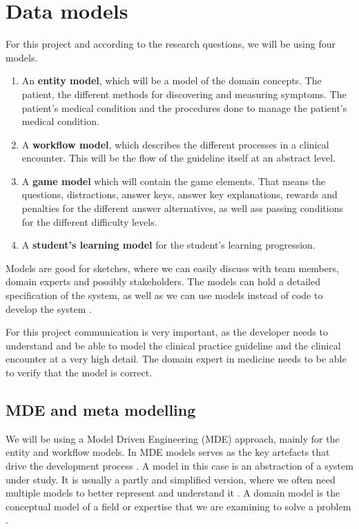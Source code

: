 \section{Data models}
For this project and according to the research questions, we will be using four models.
\begin{enumerate}
	\item An \textbf{entity model}, which will be a model of the domain concepts. The patient, the different methods for discovering and measuring symptoms. The patient's medical condition and the procedures done to manage the patient's medical condition.
	\item A \textbf{workflow model}, which describes the different processes in a clinical encounter. This will be the flow of the guideline itself at an abstract level.
	\item A \textbf{game model} which will contain the game elements. That means the questions, distractions, answer keys, answer key explanations, rewards and penalties for the different answer alternatives, as well ass passing conditions for the different difficulty levels.
	\item A \textbf{student's learning model} for the student's learning progression.
\end{enumerate}

Models are good for sketches, where we can easily discuss with team members, domain experts and possibly stakeholders. The models can hold a detailed specification of the system, as well as we can use models instead of code to develop the system \parencite{Brambilla2017}.

For this project communication is very important, as the developer needs to understand and be able to model the clinical practice guideline and the clinical encounter at a very high detail. The domain expert in medicine needs to be able to verify that the model is correct.

\subsection{MDE and meta modelling}
We will be using a Model Driven Engineering (MDE) approach, mainly for the entity and workflow models. In MDE models serves as the key artefacts that drive the development process \parencite{RodriguesdaSilva2015}. A model in this case is an abstraction of a system under study. It is usually a partly and simplified version, where we often need multiple models to better represent and understand it \parencite{RodriguesdaSilva2015}. A domain model is the conceptual model of a field or expertise that we are examining to solve a problem \parencite{Brambilla2017}.

